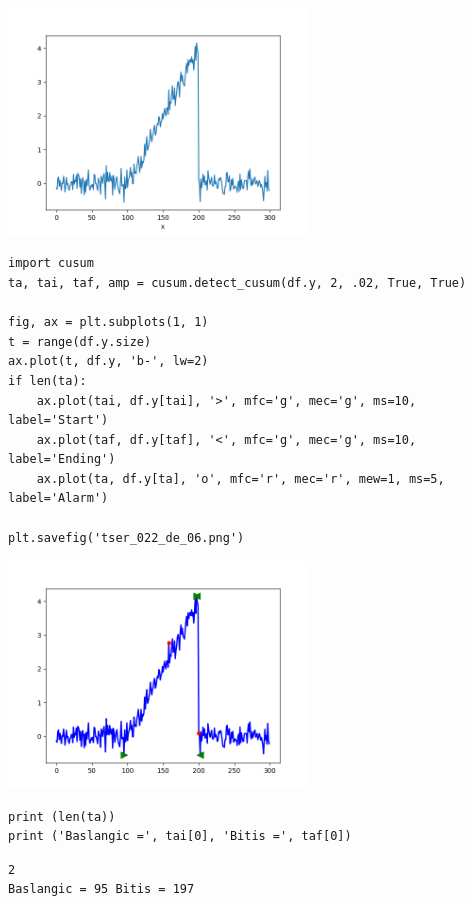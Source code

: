 \documentclass[12pt,fleqn]{article}\usepackage{../../common}
\begin{document}
\includegraphics[height=6cm]{tser_022_de_05.png}

\begin{verbatim}
import cusum
ta, tai, taf, amp = cusum.detect_cusum(df.y, 2, .02, True, True)

fig, ax = plt.subplots(1, 1)
t = range(df.y.size)
ax.plot(t, df.y, 'b-', lw=2)
if len(ta):
    ax.plot(tai, df.y[tai], '>', mfc='g', mec='g', ms=10, label='Start')
    ax.plot(taf, df.y[taf], '<', mfc='g', mec='g', ms=10, label='Ending')
    ax.plot(ta, df.y[ta], 'o', mfc='r', mec='r', mew=1, ms=5, label='Alarm')
    
plt.savefig('tser_022_de_06.png')
\end{verbatim}

\includegraphics[height=6cm]{tser_022_de_06.png}

\begin{verbatim}
print (len(ta))
print ('Baslangic =', tai[0], 'Bitis =', taf[0])
\end{verbatim}

\begin{verbatim}
2
Baslangic = 95 Bitis = 197
\end{verbatim}




 
\end{document}
